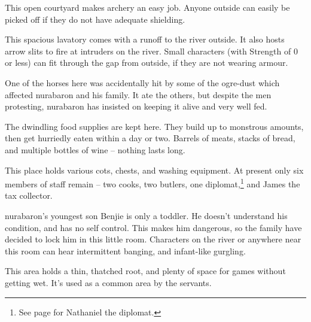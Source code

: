 \begin{multicols}{2}
\begin{figure*}[b!]
\begin{multicols}{2}
\nurabaron


\end{multicols}
\end{figure*}


This open courtyard makes archery an easy job.  Anyone outside can easily be picked off if they do not have adequate shielding.


This spacious lavatory comes with a runoff to the river outside.
It also hosts arrow slits to fire at intruders on the river.
Small characters (with Strength of 0 or less) can fit through the gap from outside, if they are not wearing armour.

One of the horses here was accidentally hit by some of the ogre-dust which affected \gls{nurabaron} and his family.  It ate the others, but despite the men protesting, \gls{nurabaron} has insisted on keeping it alive and very well fed.


The dwindling food supplies are kept here.  They build up to monstrous amounts, then get hurriedly eaten within a day or two.  Barrels of meats, stacks of bread, and multiple bottles of wine -- nothing lasts long.


This place holds various cots, chests, and washing equipment.  At present only six members of staff remain -- two cooks, two butlers, one diplomat,\footnote{See page \pageref{nathaniel} for Nathaniel the diplomat.} and James the tax collector.


\Gls{nurabaron}'s youngest son Benjie is only a toddler.
He doesn't understand his condition, and has no self control.
This makes him dangerous, so the family have decided to lock him in this little room.
Characters on the river or anywhere near this room can hear intermittent banging, and infant-like gurgling.


This area holds a thin, thatched root, and plenty of space for games without getting wet.
It's used as a common area by the servants.


\begin{boxtext}


\end{boxtext}
\end{multicols}
